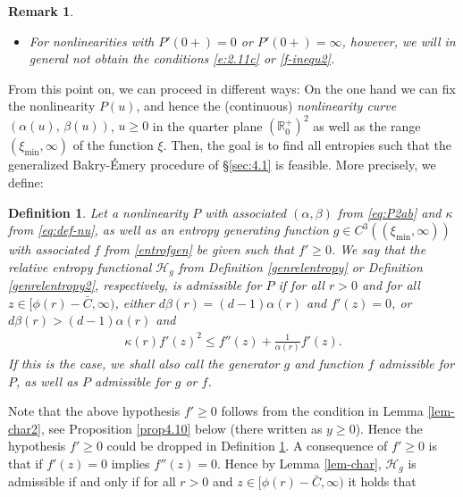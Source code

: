 \documentclass[reqno]{amsart}
\newtheorem{remark}[lemma]{Remark}
\newtheorem{definition}[lemma]{Definition}
\newcommand{\R}{\mathbb{R}}
\newcommand{\ximin}{\xi_{\text{min}}}
\begin{document}
\begin{remark}
\begin{enumerate}
\begin{itemize}
           With the scaling from the Remark \ref{linear}-(b), and $D$ now replaced by $\beta(0)$, we again deduce $\tilde f''(\bar \xi)+\tilde f'(\bar \xi)-\tilde f'^2(\bar \xi)\geq 0$ for all $\bar\xi\in\R$. 
           
           This has an important consequence: The linear behavior of $P$ at the origin, i.e. $P'(0+)\in(0,\infty)$, implies that corresponding admissible entropies must satisfy \eqref{f-inequ2} with $D=\beta(0)$. Hence, they form a subset of the admissible entropies in the linear diffusion case.
           
           
           \item For nonlinearities with $P'(0+)=0$ or $P'(0+)=\infty$, however, we will in general \emph{not} obtain the conditions \eqref{e:2.11c} or \eqref{f-inequ2}.
       \end{itemize}
    \end{enumerate}
\end{remark}
%
{F}rom this point on, we can proceed in different ways: 
On the one hand we can fix the nonlinearity $P(u)$, and hence the (continuous) \emph{nonlinearity curve} $(\alpha(u),\,\beta(u))$, $u\ge0$ in the quarter plane $(\R_0^+)^2$ as well as the range $(\ximin,\infty)$ of the function $\xi$. Then, the goal is to find all entropies such that the generalized Bakry-\'Emery procedure of \S\ref{sec:4.1} is feasible. More precisely, we define:
%
\begin{definition}\label{def:adm-entr}
    Let a nonlinearity $P$ with associated $(\alpha,\beta)$ from \eqref{eq:P2ab} and $\kappa$ from \eqref{eq:def-nu}, as well as an entropy generating function $g\in C^3((\ximin,\infty))$ with associated $f$ from \eqref{entrofgen} be given such that $f'\ge0$. We say that the relative entropy functional $\mathcal H_g$ from Definition \ref{genrelentropy} or Definition \ref{genrelentropy2}, respectively, is \emph{admissible for $P$} if for all $r>0$ and for all $z\in[\phi(r)-\bar C,\infty)$, either $d\beta(r)=(d-1)\alpha(r)$ and $f'(z)=0$, or $d\beta(r)>(d-1)\alpha(r)$ and
    \begin{align}
      \label{rem-cond2}
      \kappa(r)f'(z)^2
      \le f''(z) + \frac1{\alpha(r)} f'(z).
    \end{align}
    If this is the case, we shall also call the generator $g$ and function $f$ admissible for $P$, as well as $P$ admissible for $g$ or $f $. 
\end{definition}
%
Note that the above hypothesis $f'\ge0$ follows from the condition in Lemma \ref{lem-char2}, see Proposition \ref{prop4.10} below (there written as $y\ge0$). Hence the hypothesis $f'\ge0$ could be dropped in Definition \ref{def:adm-entr}. A consequence of $f'\ge0$ is that if $f'(z)=0$ implies $f''(z)=0$. Hence by Lemma \ref{lem-char}, $\mathcal H_g$ is admissible if and only if for all $r>0$ and $z\in[\phi(r)-\bar C,\infty)$ it holds that
\end{document}
